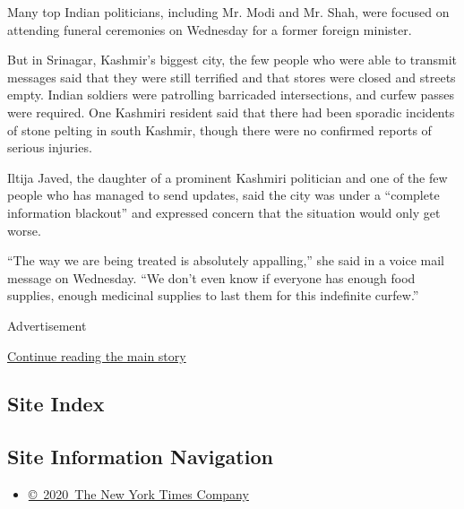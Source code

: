 Many top Indian politicians, including Mr. Modi and Mr. Shah, were
focused on attending funeral ceremonies on Wednesday for a former
foreign minister.

But in Srinagar, Kashmir's biggest city, the few people who were able to
transmit messages said that they were still terrified and that stores
were closed and streets empty. Indian soldiers were patrolling
barricaded intersections, and curfew passes were required. One Kashmiri
resident said that there had been sporadic incidents of stone pelting in
south Kashmir, though there were no confirmed reports of serious
injuries.

Iltija Javed, the daughter of a prominent Kashmiri politician and one of
the few people who has managed to send updates, said the city was under
a ``complete information blackout'' and expressed concern that the
situation would only get worse.

``The way we are being treated is absolutely appalling,'' she said in a
voice mail message on Wednesday. ``We don't even know if everyone has
enough food supplies, enough medicinal supplies to last them for this
indefinite curfew.''

Advertisement

\protect\hyperlink{after-bottom}{Continue reading the main story}

\hypertarget{site-index}{%
\subsection{Site Index}\label{site-index}}

\hypertarget{site-information-navigation}{%
\subsection{Site Information
Navigation}\label{site-information-navigation}}

\begin{itemize}
\tightlist
\item
  \href{https://help.nytimes.com/hc/en-us/articles/115014792127-Copyright-notice}{©~2020~The
  New York Times Company}
\end{itemize}

